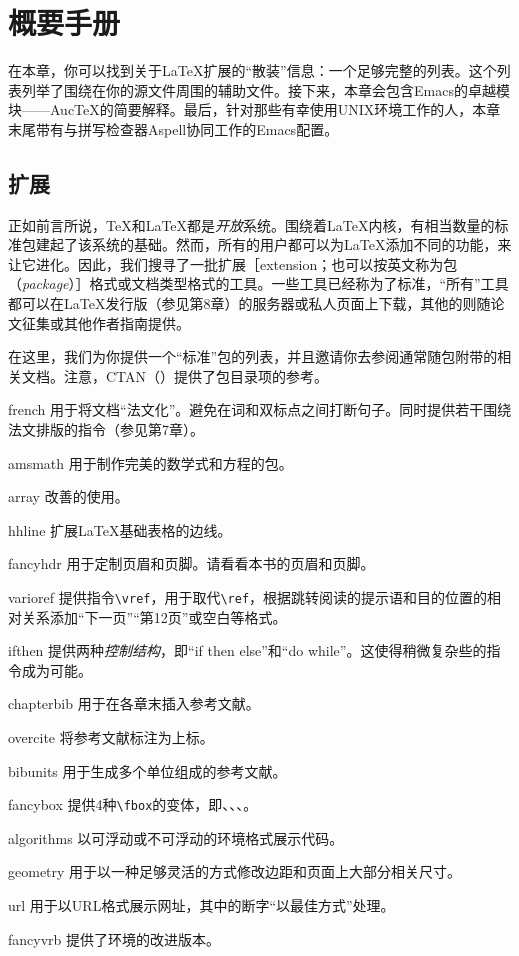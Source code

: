 \chapter{概要手册}

在本章，你可以找到关于\LaTeX 扩展的``散装''信息：一个足够完整的列表。这个列表列举了围绕在你的源文件周围的辅助文件。接下来，本章会包含\textsf{Emacs}的卓越模块——Auc\TeX 的简要解释。最后，针对那些有幸使用UNIX环境工作的人，本章末尾带有与拼写检查器\textsf{Aspell}协同工作的\textsf{Emacs}配置。

\section{扩展}

正如前言所说，\TeX 和\LaTeX 都是\emph{开放}系统。围绕着\LaTeX 内核，有相当数量的标准包建起了该系统的基础。然而，所有的用户都可以为\LaTeX 添加不同的功能，来让它进化。因此，我们搜寻了一批扩展［extension；也可以按英文称为包（\emph{package}）］格式或文档类型格式的工具。一些工具已经称为了标准，``所有''工具都可以在\LaTeX 发行版（参见第8章）的服务器或私人页面上下载，其他的则随论文征集或其他作者指南提供。

在这里，我们为你提供一个``标准''包的列表，并且邀请你去参阅通常随包附带的相关文档。注意，CTAN（）提供了包目录项的参考。
\begin{packages}
    \item[french]用于将文档``法文化''。避免在词和双标点之间打断句子。同时提供若干围绕法文排版的指令（参见第7章）。
    \item[amsmath]用于制作完美的数学式和方程的包。
    \item[array]改善的使用。
    \item[hhline]扩展\LaTeX 基础表格的边线。
    \item[fancyhdr]用于定制页眉和页脚。请看看本书的页眉和页脚。
    \item[varioref]提供指令\verb+\vref+，用于取代\verb+\ref+，根据跳转阅读的提示语和目的位置的相对关系添加``下一页''``第12页''或空白等格式。
    \item[ifthen]提供两种\emph{控制结构}，即``if then else''和``do while''。这使得稍微复杂些的指令成为可能。
    \item[chapterbib]用于在各章末插入参考文献。
    \item[overcite]将参考文献标注为上标。
    \item[bibunits]用于生成多个单位组成的参考文献。
    \item[fancybox]提供4种\verb+\fbox+的变体，即\shadowbox{\verb+\shadowbox+}、\doublebox{\verb+\doublebox+}、\ovalbox{\verb+\ovalbox+}、\Ovalbox{\verb+\Ovalbox+}。
    \item[algorithms]以可浮动或不可浮动的环境格式展示代码。
    \item[geometry]用于以一种足够灵活的方式修改边距和页面上大部分相关尺寸。
    \item[url]用于以URL格式展示网址，其中的断字``以最佳方式''处理。
    \item[fancyvrb]提供了环境的改进版本。
\end{packages}

